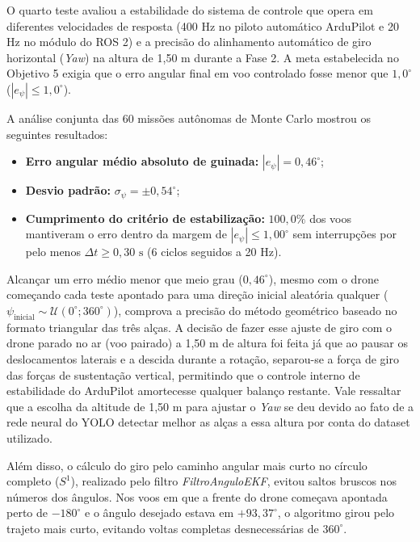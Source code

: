 
O quarto teste avaliou a estabilidade do sistema de controle que opera em diferentes velocidades de resposta (400 Hz no piloto automático ArduPilot e 20 Hz no módulo do ROS 2) e a precisão do alinhamento automático de giro horizontal (\textit{Yaw}) na altura de 1,50 m durante a Fase 2. A meta estabelecida no Objetivo 5 exigia que o erro angular final em voo controlado fosse menor que $1,0^\circ$ ($|e_\psi| \le 1,0^\circ$).

A análise conjunta das 60 missões autônomas de Monte Carlo mostrou os seguintes resultados:
\begin{itemize}
	\item \textbf{Erro angular médio absoluto de guinada:} $|e_\psi| = 0,46^\circ$;
	\item \textbf{Desvio padrão:} $\sigma_\psi = \pm 0,54^\circ$;
	\item \textbf{Cumprimento do critério de estabilização:} $100,0\%$ dos voos mantiveram o erro dentro da margem de $|e_\psi| \le 1,00^\circ$ sem interrupções por pelo menos $\Delta t \ge 0,30\text{ s}$ (6 ciclos seguidos a 20 Hz).
\end{itemize}


Alcançar um erro médio menor que meio grau ($0,46^\circ$), mesmo com o drone começando cada teste apontado para uma direção inicial aleatória qualquer ($\psi_{\text{inicial}} \sim \mathcal{U}(0^\circ; 360^\circ)$), comprova a precisão do método geométrico baseado no formato triangular das três alças. A decisão de fazer esse ajuste de giro com o drone parado no ar (voo pairado) a 1,50 m de altura foi feita já que ao pausar os deslocamentos laterais e a descida durante a rotação, separou-se a força de giro das forças de sustentação vertical, permitindo que o controle interno de estabilidade do ArduPilot amortecesse qualquer balanço restante. Vale ressaltar que a escolha da altitude de 1,50 m para ajustar o \textit{Yaw} se deu devido ao fato de a rede neural do YOLO detectar melhor as alças a essa altura por conta do dataset utilizado.

Além disso, o cálculo do giro pelo caminho angular mais curto no círculo completo ($S^1$), realizado pelo filtro \textit{FiltroAnguloEKF}, evitou saltos bruscos nos números dos ângulos. Nos voos em que a frente do drone começava apontada perto de $-180^\circ$ e o ângulo desejado estava em $+93,37^\circ$, o algoritmo girou pelo trajeto mais curto, evitando voltas completas desnecessárias de $360^\circ$.

